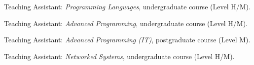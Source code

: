 \newpage
{}
\begin{cvitemize}[2016--2017]
	\item Teaching Assistant: \emph{Programming Languages}, undergraduate course (Level H/M).
	\item Teaching Assistant: \emph{Advanced Programming}, undergraduate course (Level H/M).
	\item Teaching Assistant: \emph{Advanced Programming (IT)}, postgraduate course (Level M).
	\item Teaching Assistant: \emph{Networked Systems}, undergraduate course (Level H/M).
\end{cvitemize}